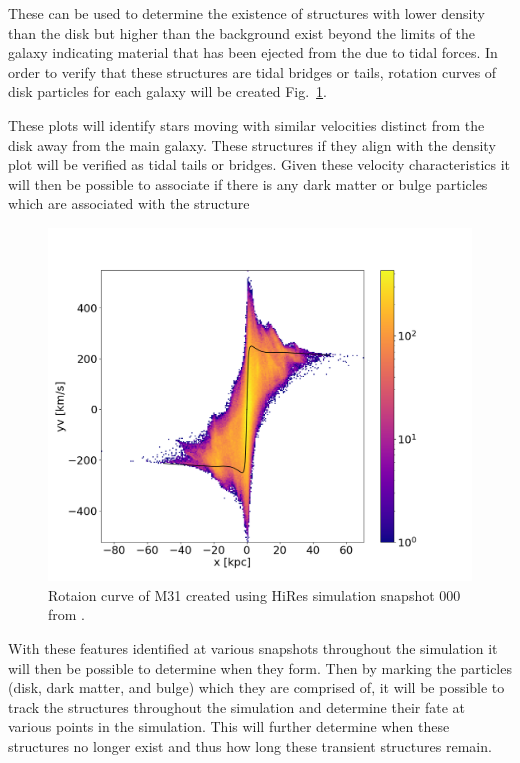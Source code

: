 \documentclass[fleqn,usenatbib]{mnras}
\begin{document}
These can be used to determine the existence of structures with lower density than the disk but higher than the background exist beyond the limits of the galaxy indicating material that has been ejected from the due to tidal forces. 
In order to verify that these structures are tidal bridges or tails, rotation curves of disk particles for each galaxy will be created Fig.~\ref{fig:RotationCurve}.

These plots will identify stars moving with similar velocities distinct from the disk away from the main galaxy. 
These structures if they align with the density plot will be verified as tidal tails or bridges. 
Given these velocity characteristics it will then be possible to associate if there is any dark matter or bulge particles which are associated with the structure

\begin{figure}
	\includegraphics[width=\columnwidth]{RotationCurve.png}
    \caption{Rotaion curve of M31 created using HiRes simulation snapshot 000 from \cite{van_der_Marel_Besla_2012}.}
    \label{fig:RotationCurve}
\end{figure}

With these features identified at various snapshots throughout the simulation it will then be possible to determine when they form. 
Then by marking the particles (disk, dark matter, and bulge) which they are comprised of, it will be possible to track the structures throughout the simulation and determine their fate at various points in the simulation. 
This will further determine when these structures no longer exist and thus how long these transient structures remain.
\end{document}
